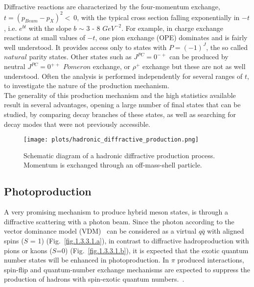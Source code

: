  ~\par Diffractive reactions are characterized by the four-momentum exchange, $t = (p_{Beam}-p_{X})^{2}<~0$, with the typical cross section falling exponentially in $-t$, i.e. $e^{bt}$ with the slope $b$ $\sim$ 3 - 8 $GeV^{-2}$. For example, in charge exchange reactions at small values of $-t$, one pion exchange (OPE) dominates and is fairly well understood. It provides access only to states with $P = (-1)^{J}$, the so called $natural$ parity states. Other states such as $J^{PC} = 0^{-+}$ can be produced by neutral $J^{PC} = 0^{++}$ $Pomeron$ exchange, or $\rho^{+}$ exchange but these are not as well understood. Often the analysis is performed independently for several ranges of $t$, to investigate the nature of the production mechanism.\\
The generality of this production mechanism and the high statistics available result in several advantages, opening a large number of final states that can be studied, by comparing decay branches of these states, as well as searching for decay modes that were not previously accessible.

\begin{figure}[H]
    \centering
        \texttt{[image: plots/hadronic\_diffractive\_production.png]}
        \caption{Schematic diagram of a hadronic diffractive production process. Momentum is exchanged through an off-mass-shell particle.}
        \label{fig.1.3.2}
\end{figure}

 \subsection{Photoproduction}

 A very promising mechanism to produce hybrid meson states, is through a diffractive scattering with a photon beam. Since the photon according to the vector dominance model (VDM)~\cite{Bauer78} can be considered as a virtual $q\bar{q}$ with aligned spins ($S$ = 1) (Fig.~\ref{fig.1.3.3.1.a}), in contrast to diffractive hadroproduction with pions or kaons ($S$=0) (Fig.~\ref{fig.1.3.3.1.b}), it is expected that the exotic quantum number states will be enhanced in photoproduction. In $\pi$ produced interactions, spin-flip and quantum-number exchange mechanisms are expected to suppress the production of hadrons with spin-exotic quantum numbers.~\cite{Isgur85, Szczepaniak01}.

